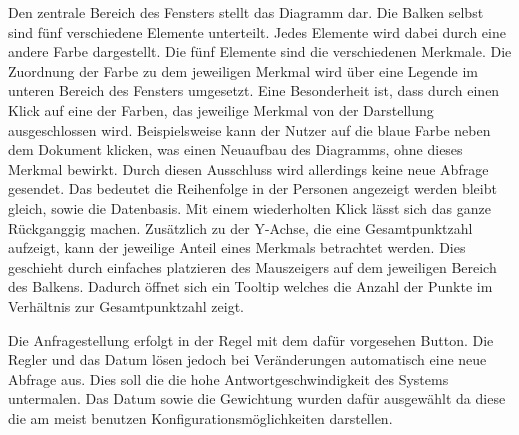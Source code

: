 Den zentrale Bereich des Fensters stellt das Diagramm dar. Die Balken selbst sind fünf verschiedene Elemente unterteilt. Jedes Elemente wird dabei durch eine andere Farbe dargestellt. Die fünf Elemente sind die verschiedenen Merkmale. Die Zuordnung der Farbe zu dem jeweiligen Merkmal wird über eine Legende im unteren Bereich des Fensters umgesetzt. Eine Besonderheit ist, dass durch einen Klick auf eine der Farben, das jeweilige Merkmal von der Darstellung ausgeschlossen wird. Beispielsweise kann der Nutzer auf die blaue Farbe neben dem Dokument klicken, was einen Neuaufbau des Diagramms, ohne dieses Merkmal bewirkt. Durch diesen Ausschluss wird allerdings keine neue Abfrage gesendet. Das  bedeutet die Reihenfolge in der Personen angezeigt werden bleibt gleich, sowie die Datenbasis. Mit einem wiederholten Klick lässt sich das ganze Rückganggig machen. Zusätzlich zu der Y-Achse, die eine Gesamtpunktzahl aufzeigt, kann der jeweilige Anteil eines Merkmals betrachtet werden. Dies geschieht durch einfaches platzieren des Mauszeigers auf dem jeweiligen Bereich des Balkens. Dadurch öffnet sich ein Tooltip welches die Anzahl der Punkte im Verhältnis zur Gesamtpunktzahl zeigt.

Die Anfragestellung erfolgt in der Regel mit dem dafür vorgesehen Button. Die Regler und das Datum lösen jedoch bei Veränderungen automatisch eine neue Abfrage aus. Dies soll die  die hohe Antwortgeschwindigkeit des Systems untermalen. Das Datum sowie die Gewichtung wurden dafür ausgewählt da diese die am meist benutzen Konfigurationsmöglichkeiten darstellen.